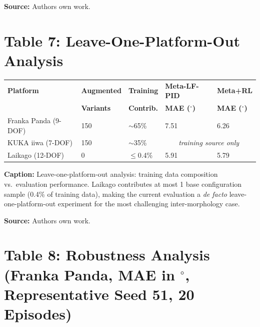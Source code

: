 \documentclass[11pt,a4paper]{article}
\begin{document}
\vspace{0.2cm}
\noindent
\textbf{Source:} Authors own work.


\section*{Table 7: Leave-One-Platform-Out Analysis}

\begin{tabular}{@{\extracolsep{\fill}}lllll}
\hline
\textbf{Platform} & \textbf{Augmented} & \textbf{Training} & \textbf{Meta-LF-PID} & \textbf{Meta+RL} \\
& \textbf{Variants} & \textbf{Contrib.} & \textbf{MAE ($^\circ$)} & \textbf{MAE ($^\circ$)} \\
\hline
Franka Panda (9-DOF) & 150 & $\sim$65\% & 7.51 & 6.26 \\
KUKA iiwa (7-DOF) & 150 & $\sim$35\% & \multicolumn{2}{c}{\textit{training source only}} \\
Laikago (12-DOF) & 0 & $\leq$0.4\% & 5.91 & 5.79 \\
\hline
\end{tabular}

\vspace{0.2cm}
\noindent
\textbf{Caption:} Leave-one-platform-out analysis: training data composition vs.\ evaluation performance. Laikago contributes at most 1 base configuration sample (0.4\% of training data), making the current evaluation a \textit{de facto} leave-one-platform-out experiment for the most challenging inter-morphology case.

\vspace{0.2cm}
\noindent
\textbf{Source:} Authors own work.


\section*{Table 8: Robustness Analysis (Franka Panda, MAE in $^\circ$, Representative Seed 51, 20 Episodes)}
\end{document}
